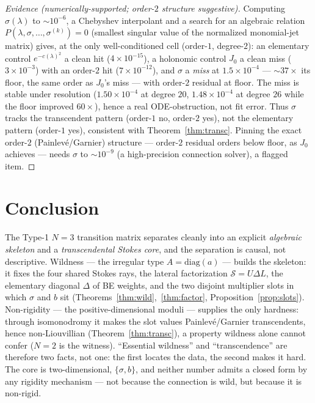 \documentclass[11pt]{article}
\theoremstyle{definition}
\theoremstyle{remark}
\newcommand{\diag}{\mathrm{diag}}
\newcommand{\Scat}{\mathcal{S}}
\begin{document}
\begin{proof}[Evidence (numerically-supported; order-$2$ structure suggestive)]
Computing $\sigma(\lambda)$ to $\sim10^{-6}$, a Chebyshev interpolant and a search for an
algebraic relation $P(\lambda,\sigma,\dots,\sigma^{(k)})=0$ (smallest singular value of the
normalized monomial-jet matrix) gives, at the only well-conditioned cell (order-$1$,
degree-$2$): an elementary control $e^{-c(\lambda)^2}$ a clean hit ($4\times10^{-15}$), a
holonomic control $J_0$ a clean miss ($3\times10^{-3}$) with an order-$2$ hit
($7\times10^{-12}$), and $\sigma$ a \emph{miss} at $1.5\times10^{-4}$ --- $\sim37\times$ its
floor, the same order as $J_0$'s miss --- with order-$2$ residual at floor. The miss is stable
under resolution ($1.50\times10^{-4}$ at degree $20$, $1.48\times10^{-4}$ at degree $26$ while
the floor improved $60\times$), hence a real ODE-obstruction, not fit error. Thus $\sigma$
tracks the transcendent pattern (order-$1$ no, order-$2$ yes), not the elementary pattern
(order-$1$ yes), consistent with Theorem~\ref{thm:transc}. Pinning the exact order-$2$
(Painlev\'e/Garnier) structure --- order-$2$ residual orders below floor, as $J_0$ achieves
--- needs $\sigma$ to $\sim10^{-9}$ (a high-precision connection solver), a flagged item.
\end{proof}

\section{Conclusion}\label{sec:concl}

The Type-1 $N{=}3$ transition matrix separates cleanly into an explicit \emph{algebraic
skeleton} and a \emph{transcendental Stokes core}, and the separation is causal, not
descriptive. Wildness --- the irregular type $A=\diag(a)$ --- builds the skeleton: it fixes
the four shared Stokes rays, the lateral factorization $\Scat=U\Delta L$, the elementary
diagonal $\Delta$ of BE weights, and the two disjoint multiplier slots in which $\sigma$ and
$b$ sit (Theorems~\ref{thm:wild},~\ref{thm:factor}, Proposition~\ref{prop:slots}).
Non-rigidity --- the positive-dimensional moduli --- supplies the only hardness: through
isomonodromy it makes the slot values Painlev\'e/Garnier transcendents, hence non-Liouvillian
(Theorem~\ref{thm:transc}), a property wildness alone cannot confer ($N{=}2$ is the witness).
``Essential wildness'' and ``transcendence'' are therefore two facts, not one: the first
locates the data, the second makes it hard. The core is two-dimensional, $\{\sigma,b\}$, and
neither number admits a closed form by any rigidity mechanism --- not because the connection
is wild, but because it is non-rigid.
\end{document}
